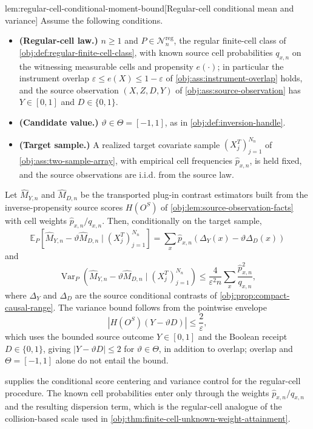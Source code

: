\begin{lemmav}{lem:regular-cell-conditional-moment-bound}[Regular-cell conditional mean and variance]
Assume the following conditions.
\begin{itemize}
\item \textbf{(Regular-cell law.)} \(n\ge1\) and \(P\in\mathcal N_n^{\mathrm{reg}}\), the regular finite-cell class of \cref{obj:def:regular-finite-cell-class}, with known source cell probabilities \(q_{x,n}\) on the witnessing measurable cells and propensity \(e(\cdot)\); in particular the instrument overlap \(\varepsilon\le e(X)\le1-\varepsilon\) of \cref{obj:ass:instrument-overlap} holds, and the source observation \((X,Z,D,Y)\) of \cref{obj:ass:source-observation} has \(Y\in[0,1]\) and \(D\in\{0,1\}\).
\item \textbf{(Candidate value.)} \(\vartheta\in\Theta=[-1,1]\), as in \cref{obj:def:inversion-handle}.
\item \textbf{(Target sample.)} A realized target covariate sample \((X_j^T)_{j=1}^{N_n}\) of \cref{obj:ass:two-sample-array}, with empirical cell frequencies \(\widehat p_{x,n}\), is held fixed, and the source observations are i.i.d. from the source law.
\end{itemize}
Let \(\widehat M_{Y,n}\) and \(\widehat M_{D,n}\) be the transported plug-in contrast estimators built from the inverse-propensity source scores \(H(O^S)\) of \cref{obj:lem:source-observation-facts} with cell weights \(\widehat p_{x,n}/q_{x,n}\). Then, conditionally on the target sample,
\[
\mathbb E_P\!\left[\widehat M_{Y,n}-\vartheta\widehat M_{D,n}\mid(X_j^T)_{j=1}^{N_n}\right]
=\sum_x\widehat p_{x,n}\left(\Delta_Y(x)-\vartheta\Delta_D(x)\right)
\]
and
\[
\operatorname{Var}_P\!\left(\widehat M_{Y,n}-\vartheta\widehat M_{D,n}\mid(X_j^T)_{j=1}^{N_n}\right)
\le\frac{4}{\varepsilon^2n}\sum_x\frac{\widehat p_{x,n}^2}{q_{x,n}},
\]
where \(\Delta_Y\) and \(\Delta_D\) are the source conditional contrasts of \cref{obj:prop:compact-causal-range}. The variance bound follows from the pointwise envelope
\[
\left|H(O^S)(Y-\vartheta D)\right|\le\frac2\varepsilon,
\]
which uses the bounded source outcome \(Y\in[0,1]\) and the Boolean receipt \(D\in\{0,1\}\), giving \(|Y-\vartheta D|\le2\) for \(\vartheta\in\Theta\), in addition to overlap; overlap and \(\Theta=[-1,1]\) alone do not entail the bound.
\end{lemmav}

 supplies the conditional score centering and variance control for the regular-cell procedure. The known cell probabilities enter only through the weights \(\widehat p_{x,n}/q_{x,n}\) and the resulting dispersion term, which is the regular-cell analogue of the collision-based scale used in \cref{obj:thm:finite-cell-unknown-weight-attainment}.

